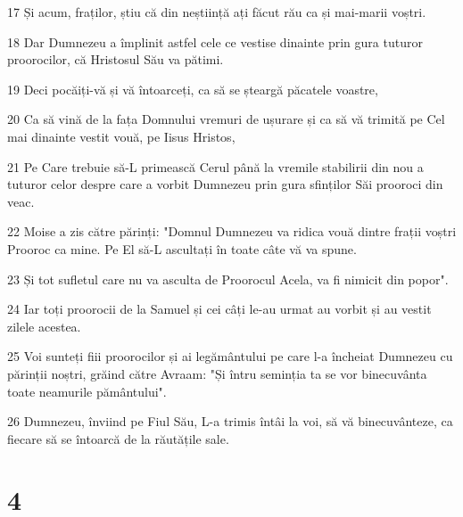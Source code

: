 \par 17 Și acum, fraților, știu că din neștiință ați făcut rău ca și mai-marii voștri.
\par 18 Dar Dumnezeu a împlinit astfel cele ce vestise dinainte prin gura tuturor proorocilor, că Hristosul Său va pătimi.
\par 19 Deci pocăiți-vă și vă întoarceți, ca să se șteargă păcatele voastre,
\par 20 Ca să vină de la fața Domnului vremuri de ușurare și ca să vă trimită pe Cel mai dinainte vestit vouă, pe Iisus Hristos,
\par 21 Pe Care trebuie să-L primească Cerul până la vremile stabilirii din nou a tuturor celor despre care a vorbit Dumnezeu prin gura sfinților Săi prooroci din veac.
\par 22 Moise a zis către părinți: "Domnul Dumnezeu va ridica vouă dintre frații voștri Prooroc ca mine. Pe El să-L ascultați în toate câte vă va spune.
\par 23 Și tot sufletul care nu va asculta de Proorocul Acela, va fi nimicit din popor".
\par 24 Iar toți proorocii de la Samuel și cei câți le-au urmat au vorbit și au vestit zilele acestea.
\par 25 Voi sunteți fiii proorocilor și ai legământului pe care l-a încheiat Dumnezeu cu părinții noștri, grăind către Avraam: "Și întru seminția ta se vor binecuvânta toate neamurile pământului".
\par 26 Dumnezeu, înviind pe Fiul Său, L-a trimis întâi la voi, să vă binecuvânteze, ca fiecare să se întoarcă de la răutățile sale.

\chapter{4}

